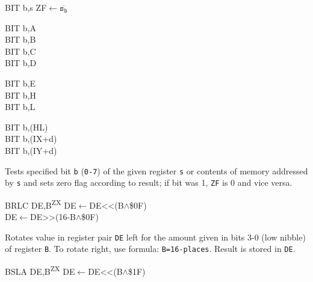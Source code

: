 \documentclass[12pt,twoside,openright,a4paper]{book}
\newcommand{\ZXN}{\textnormal{\textsuperscript{ZX}}}
\begin{document}
\begin{basedescript}{
	\desclabelstyle{\multilinelabel}
	\desclabelwidth{3cm}}
	\begin{detailitem}{BIT b,s}
		{ZF$\leftarrow\mathtt{\overline{s_b}}$}

		\begin{DetailVariants}
			BIT b,A\\
			BIT b,B\\
			BIT b,C\\
			BIT b,D

			\columnbreak
			BIT b,E\\
			BIT b,H\\
			BIT b,L
			
			\columnbreak
			BIT b,(HL)\\
			BIT b,(IX+d)\\
			BIT b,(IY+d)
		\end{DetailVariants}

		Tests specified bit {\tt b} ({\tt 0-7}) of the given register {\tt s} or contents of memory addressed by {\tt s} and sets zero flag according to result; if bit was 1, {\tt ZF} is 0 and vice versa.

		\begin{DetailEffects}
		\end{DetailEffects}

		\begin{DetailTiming}
		\end{DetailTiming}

	\end{detailitem}

	\begin{detailitem}{BRLC DE,B\ZXN}
		{DE$\leftarrow$DE<<(B$\wedge$\$0F)\\
		DE$\leftarrow$DE>>(16-B$\wedge$\$0F)}

		Rotates value in register pair {\tt DE} left for the amount given in bits 3-0 (low nibble) of register {\tt B}. To rotate right, use formula: {\tt B=16-places}. Result is stored in {\tt DE}.

		\DetailNoEffect

		\begin{DetailTiming}
			\DetailTime{}{2}{8}
		\end{DetailTiming}

	\end{detailitem}

	\begin{detailitem}{BSLA DE,B\ZXN}
		{DE$\leftarrow$DE<<(B$\wedge$\$1F)}


\end{detailitem}
\end{basedescript}
\end{document}
